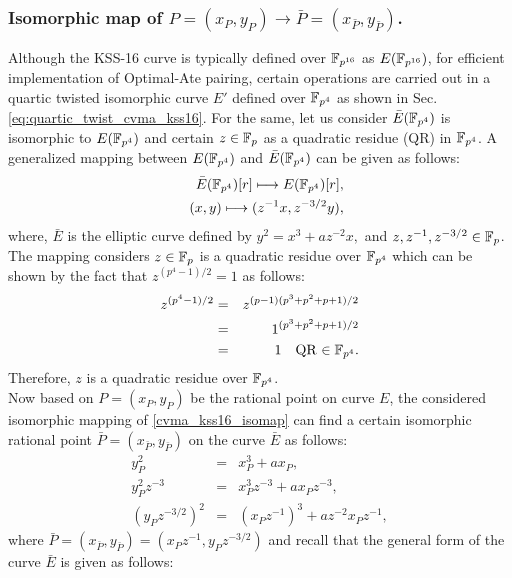 \subsubsection{Isomorphic map of  \texorpdfstring{$P=(x_P,y_P) \to \bar P=(x_{\bar P},y_{\bar P})$}{}.}
Although the KSS-16 curve is typically defined over $\mathbb{F}_{p^{16}}$ as $E(\mathbb{F}_{p^{16}})$, for efficient implementation of Optimal-Ate pairing, certain operations are carried out in a quartic twisted isomorphic curve $E'$ defined over $\mathbb{F}_{p^4}$ as shown in Sec. \ref{eq:quartic_twist_cvma_kss16}. 
For the same, let us consider $\bar{E}(\mathbb{F}_{p^4})$ is isomorphic to $E(\mathbb{F}_{p^4})$ and certain $z \in {\mathbb{F}}_{p}$ as a quadratic residue (QR) in $\mathbb{F}_{p^4}$. 
A generalized mapping between $E(\mathbb{F}_{p^4})$ and $\bar{E}(\mathbb{F}_{p^4})$ can be given as follows:
\begin{eqnarray}
&&\bar{E}(\mathbb{F}_{p^4})[r]\longmapsto E(\mathbb{F}_{p^4})[r],\nonumber\\
&&(x,y)\longmapsto (z^{-1}x,z^{-3/2}y),\label{cvma_kss16_isomap}\nonumber
\end{eqnarray}
where,  $\bar{E}$ is the elliptic curve defined by  $ y^2=x^3+az^{-2}x,$ and $z, z^{-1},z^{-3/2}\in {\mathbb{F}}_{p}$.\\
The mapping considers $z \in {\mathbb{F}}_{p}$ is a quadratic residue over $\mathbb{F}_{p^4}$ which can be shown by the fact that $z^{(p^4-1)/2} = 1$ as follows:
\begin{eqnarray}
z^{(p^4-1)/2}& = &z^{(p-1)(p^3+p^2+p+1)/2 } \nonumber \\
& = &1^{(p^3+p^2+p+1)/2 } \nonumber \\
& = & 1 \quad \text{QR $\in \mathbb{F}_{p^4}$}.
\end{eqnarray}
Therefore, $z$ is a quadratic residue over $\mathbb{F}_{p^4}$.\\
Now  based on $P= (x_P, y_P)$ be the rational point on curve $E$, the considered isomorphic mapping of \eqref{cvma_kss16_isomap}  can find a certain isomorphic rational point $\bar P = (x_{\bar P}, y_{\bar P})$ on the curve $\bar E$ as follows:
\begin{eqnarray}\label{eq:cvma_kss16_bar_P}
y_P^2 & = & x_P^3+ax_P, \nonumber \\
y_P^2 z^{-3}& = & x_P^3 z^{-3} +ax_Pz^{-3}, \nonumber \\
(y_P z^{-3/2})^2& = & (x_Pz^{-1})^3 +az^{-2} x_Pz^{-1},
\end{eqnarray}
where $\bar P = (x_{\bar P}, y_{\bar P}) = (x_P z^{-1},y_P z^{-3/2})$ and recall that the general form of the curve $\bar E$ is given as follows:
